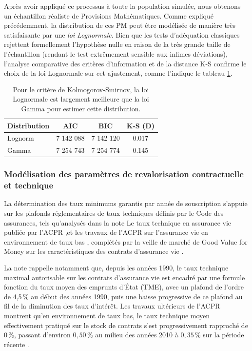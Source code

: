 Après avoir appliqué ce processus à toute la population simulée, nous obtenons un échantillon réaliste de Provisions Mathématiques. Comme expliqué précédemment, la distribution de ces PM peut être modélisée de manière très satisfaisante par une \textit{loi Lognormale}. Bien que les tests d'adéquation classiques rejettent formellement l'hypothèse nulle en raison de la très grande taille de l'échantillon (rendant le test extrêmement sensible aux infimes déviations), l'analyse comparative des critères d'information et de la distance K-S confirme le choix de la loi Lognormale sur cet ajustement, comme l'indique le tableau \ref{tab:stats_pm}.

\begin{table}[H]
\centering
\begin{tabular}{@{}lccc@{}}
\toprule
\textbf{Distribution} & \textbf{AIC} & \textbf{BIC} & \textbf{K-S (D)} \\
\midrule
Lognorm & 7 142 088 & 7 142 120 & 0.017 \\
Gamma & 7 254 743 & 7 254 774 & 0.145 \\
\bottomrule
\end{tabular}
\caption{Pour le critère de Kolmogorov-Smirnov, la loi Lognormale est largement meilleure que la loi Gamma pour estimer cette distribution.}
\label{tab:stats_pm}
\end{table}


\subsubsection{Modélisation des paramètres de revalorisation contractuelle et technique}

La détermination des taux minimums garantis par année de souscription s'appuie sur les plafonds réglementaires de taux techniques définis par le Code des assurances, tels qu'analysés dans la note \og Le taux technique en assurance vie \fg{} publiée par l'ACPR \cite{acpr66},et les travaux de l'ACPR sur l'assurance vie en environnement de taux bas \cite{acprTauxBas}, complétés par la veille de marché de Good Value for Money sur les caractéristiques des contrats d'assurance vie \cite{gvmTMG}.

La note \cite{acpr66} rappelle notamment que, depuis les années 1990, le taux technique maximal autorisable sur les contrats d'assurance vie est encadré par une formule fonction du taux moyen des emprunts d'État (TME), avec un plafond de l'ordre de 4{,}5\,\% au début des années 1990, puis une baisse progressive de ce plafond au fil de la diminution des taux d'intérêt. Les travaux ultérieurs de l'ACPR montrent qu'en environnement de taux bas, le taux technique moyen effectivement pratiqué sur le stock de contrats s'est progressivement rapproché de 0\,\%, passant d'environ $0{,}50\,\%$ au milieu des années 2010 \cite{acprTauxBas} à $0{,}35\,\%$ sur la période récente \cite{acprRevalo2024}.


